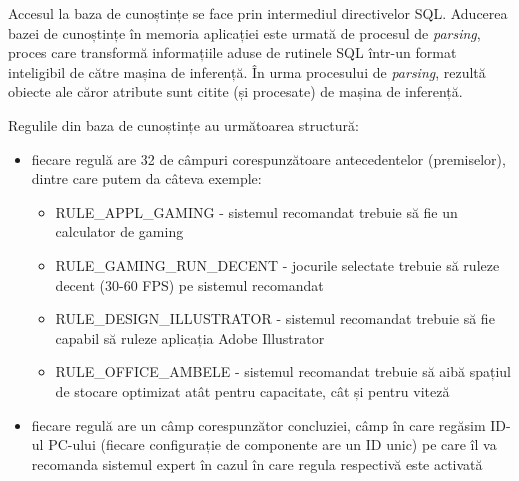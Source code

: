 \documentclass[12pt]{article}
\begin{document}
        Accesul la baza de cunoștințe se face prin intermediul directivelor SQL. Aducerea bazei de cunoștințe în memoria aplicației este urmată de procesul de \textit{parsing}, proces care transformă informațiile aduse de rutinele SQL într-un format inteligibil de către mașina de inferență. În urma procesului de \textit{parsing}, rezultă obiecte ale căror atribute sunt citite (și procesate) de mașina de inferență.

        Regulile din baza de cunoștințe au următoarea structură:
        \begin{itemize}
            \item{fiecare regulă are 32 de câmpuri corespunzătoare antecedentelor (premiselor), dintre care putem da câteva exemple:}
                \begin{itemize}
                    \item{RULE\_APPL\_GAMING - sistemul recomandat trebuie să fie un calculator de gaming}
                    \item{RULE\_GAMING\_RUN\_DECENT - jocurile selectate trebuie să ruleze decent (30-60 FPS) pe sistemul recomandat}
                    \item{RULE\_DESIGN\_ILLUSTRATOR - sistemul recomandat trebuie să fie capabil să ruleze aplicația Adobe Illustrator}
                    \item{RULE\_OFFICE\_AMBELE - sistemul recomandat trebuie să aibă spațiul de stocare optimizat atât pentru capacitate, cât și pentru viteză}
                \end{itemize}
            \item{fiecare regulă are un câmp corespunzător concluziei, câmp în care regăsim ID-ul PC-ului (fiecare configurație de componente are un ID unic) pe care îl va recomanda sistemul expert în cazul în care regula respectivă este activată}
        \end{itemize}
\end{document}
